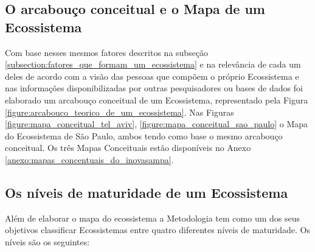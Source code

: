 \subsection{O arcabouço conceitual e o Mapa de um Ecossistema}
\label{subsection:arcabouco_conceitual_e_modelo}

Com base nesses mesmos fatores descritos na subseção \ref{subsection:fatores_que_formam_um_ecossistema} e na relevância de cada um deles de acordo com a visão das pessoas que compõem o próprio Ecossistema e nas informações disponibilizadas por outras pesquisadores ou bases de dados foi elaborado um arcabouço conceitual de um Ecossistema, representado pela Figura \ref{figure:arcabouco_teorico_de_um_ecossistema}. Nas Figuras \ref{figure:mapa_conceitual_tel_aviv}, \ref{figure:mapa_conceitual_sao_paulo} o Mapa do Ecossistema de São Paulo, ambos tendo como base o mesmo arcabouço conceitual. Os três Mapas Conceituais estão disponíveis no Anexo \ref{anexo:mapas_concentuais_do_inovasampa}.

\subsection{Os níveis de maturidade de um Ecossistema}
\label{subsection:niveis_de_maturidade_de_um_ecossistema}

Além de elaborar o mapa do ecossistema a Metodologia tem como um dos seus objetivos classificar Ecossistemas entre quatro diferentes níveis de maturidade. Os níveis são os seguintes:

